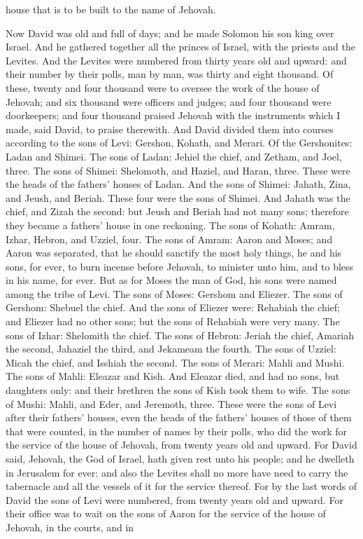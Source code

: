house that is to be built to the name of Jehovah. 

Now David was old and full of days; and he made Solomon his son king over Israel. And he gathered together all the princes of Israel, with the priests and the Levites. And the Levites were numbered from thirty years old and upward: and their number by their polls, man by man, was thirty and eight thousand. Of these, twenty and four thousand were to oversee the work of the house of Jehovah; and six thousand were officers and judges; and four thousand were doorkeepers; and four thousand praised Jehovah with the instruments which I made, said David, to praise therewith. And David divided them into courses according to the sons of Levi: Gershon, Kohath, and Merari.  Of the Gershonites: Ladan and Shimei. The sons of Ladan: Jehiel the chief, and Zetham, and Joel, three. The sons of Shimei: Shelomoth, and Haziel, and Haran, three. These were the heads of the fathers’ houses of Ladan. And the sons of Shimei: Jahath, Zina, and Jeush, and Beriah. These four were the sons of Shimei. And Jahath was the chief, and Zizah the second: but Jeush and Beriah had not many sons; therefore they became a fathers’ house in one reckoning.  The sons of Kohath: Amram, Izhar, Hebron, and Uzziel, four. The sons of Amram: Aaron and Moses; and Aaron was separated, that he should sanctify the most holy things, he and his sons, for ever, to burn incense before Jehovah, to minister unto him, and to bless in his name, for ever. But as for Moses the man of God, his sons were named among the tribe of Levi. The sons of Moses: Gershom and Eliezer. The sons of Gershom: Shebuel the chief. And the sons of Eliezer were: Rehabiah the chief; and Eliezer had no other sons; but the sons of Rehabiah were very many. The sons of Izhar: Shelomith the chief. The sons of Hebron: Jeriah the chief, Amariah the second, Jahaziel the third, and Jekameam the fourth. The sons of Uzziel: Micah the chief, and Isshiah the second.  The sons of Merari: Mahli and Mushi. The sons of Mahli: Eleazar and Kish. And Eleazar died, and had no sons, but daughters only: and their brethren the sons of Kish took them to wife. The sons of Mushi: Mahli, and Eder, and Jeremoth, three.  These were the sons of Levi after their fathers’ houses, even the heads of the fathers’ houses of those of them that were counted, in the number of names by their polls, who did the work for the service of the house of Jehovah, from twenty years old and upward. For David said, Jehovah, the God of Israel, hath given rest unto his people; and he dwelleth in Jerusalem for ever: and also the Levites shall no more have need to carry the tabernacle and all the vessels of it for the service thereof. For by the last words of David the sons of Levi were numbered, from twenty years old and upward. For their office was to wait on the sons of Aaron for the service of the house of Jehovah, in the courts, and in 